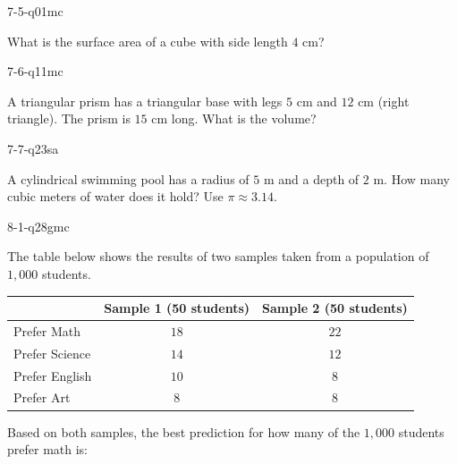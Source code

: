 \begin{practiceQuestion}{7-5-q01}{mc}
\begin{questionText}
What is the surface area of a cube with side length $4$ cm?
\end{questionText}
\end{practiceQuestion}

\begin{practiceQuestion}{7-6-q11}{mc}
\begin{questionText}
A triangular prism has a triangular base with legs $5$ cm and $12$ cm (right triangle). The prism is $15$ cm long. What is the volume?
\end{questionText}
\end{practiceQuestion}

\begin{practiceQuestion}{7-7-q23}{sa}
\begin{questionText}
A cylindrical swimming pool has a radius of $5$ m and a depth of $2$ m. How many cubic meters of water does it hold? Use $\pi \approx 3.14$.
\end{questionText}
\end{practiceQuestion}

\begin{practiceQuestion}{8-1-q28}{gmc}
\begin{questionText}
The table below shows the results of two samples taken from a population of $1{,}000$ students.

\begin{center}
\begin{tabular}{|l|c|c|}
\hline
 & \textbf{Sample 1 (50 students)} & \textbf{Sample 2 (50 students)} \\
\hline
Prefer Math & $18$ & $22$ \\
\hline
Prefer Science & $14$ & $12$ \\
\hline
Prefer English & $10$ & $8$ \\
\hline
Prefer Art & $8$ & $8$ \\
\hline
\end{tabular}
\end{center}

Based on both samples, the best prediction for how many of the $1{,}000$ students prefer math is:
\end{questionText}
\end{practiceQuestion}


